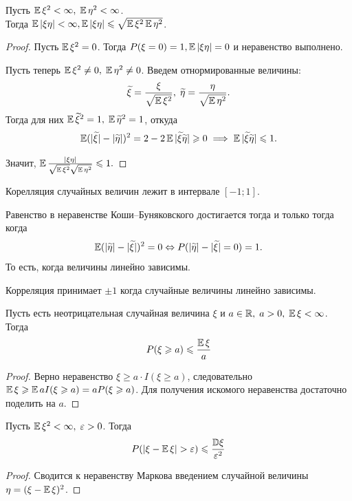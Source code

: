 \begin{theorem}
Пусть $\operatorname{\mathbb{E}}\xi^2 < \infty,\; \operatorname{\mathbb{E}}\eta^2 < \infty$.\\
Тогда $\operatorname{\mathbb{E}}|\xi\eta| < \infty, \operatorname{\mathbb{E}}|\xi\eta| \leqslant \sqrt{\operatorname{\mathbb{E}}\xi^2 \operatorname{\mathbb{E}}\eta^2}$.
\end{theorem}
\begin{proof}
Пусть $\operatorname{\mathbb{E}}\xi^2 = 0$. Тогда $P(\xi = 0) = 1, \operatorname{\mathbb{E}}|\xi\eta| = 0$ и неравенство выполнено.

Пусть теперь $\operatorname{\mathbb{E}}\xi^2 \neq 0,\; \operatorname{\mathbb{E}}\eta^2 \neq 0$. Введем отнормированные величины:
\[\widetilde{\xi} = \frac{\xi}{\sqrt{\operatorname{\mathbb{E}}\xi^2}}, \; \widetilde{\eta} = \frac{\eta}{\sqrt{\operatorname{\mathbb{E}}\eta^2}}.\]
Тогда для них $\operatorname{\mathbb{E}}\widetilde{\xi}^2 = 1,\; \operatorname{\mathbb{E}}\widetilde{\eta}^2 = 1$, откуда 
\[\operatorname{\mathbb{E}}(|\widetilde{\xi}| - |\widetilde{\eta}|)^2 = 2 - 2\operatorname{\mathbb{E}}|\widetilde{\xi} \widetilde{\eta}| \geqslant 0 \implies \operatorname{\mathbb{E}}|\widetilde{\xi}\widetilde{\eta}| \leqslant 1.\]

Значит, $\operatorname{\mathbb{E}}\frac{|\xi\eta|}{\sqrt{\operatorname{\mathbb{E}}\xi^2} \sqrt{\operatorname{\mathbb{E}}\eta^2}} \leqslant 1.$
\end{proof}
\begin{corollary}
Корелляция случайных величин лежит в интервале $[-1; 1]$.
\end{corollary}
\begin{corollary}
Равенство в неравенстве Коши--Буняковского достигается тогда и только тогда когда \[\operatorname{\mathbb{E}}(|\widetilde{\eta}| - |\widetilde{\xi}|)^2 = 0 \Leftrightarrow P(|\widetilde{\eta}| - |\widetilde{\xi}| = 0) = 1.\]
То есть, когда величины линейно зависимы.
\end{corollary}
\begin{corollary}
Корреляция принимает $\pm 1$ когда случайные величины линейно зависимы.
\end{corollary}

\begin{theorem}
Пусть есть неотрицательная случайная величина $\xi$ и $ a\in \mathbb{R},\; a > 0,\; \operatorname{\mathbb{E}}\xi < \infty$.
Тогда 
\[P(\xi \geqslant a) \leqslant \frac{\operatorname{\mathbb{E}}\xi}{a}\]
\end{theorem}
\begin{proof}
Верно неравенство $\xi \geqslant a \cdot I(\xi \geqslant a)$, следовательно $\operatorname{\mathbb{E}}\xi \geqslant \operatorname{\mathbb{E}} a I(\xi \geqslant a) = aP(\xi \geqslant a)$. Для получения искомого неравенства достаточно поделить на $a$.
\end{proof}
\begin{theorem}
Пусть $\operatorname{\mathbb{E}}\xi^2 < \infty,\; \varepsilon > 0$. Тогда
\[P(|\xi - \operatorname{\mathbb{E}}\xi| > \varepsilon) \leqslant \frac{{\mathbb{D}}\xi}{\varepsilon^2}\]
\end{theorem}
\begin{proof}
Сводится к неравенству Маркова введением случайной величины $\eta = (\xi - \operatorname{\mathbb{E}}\xi)^2$.
\end{proof}

